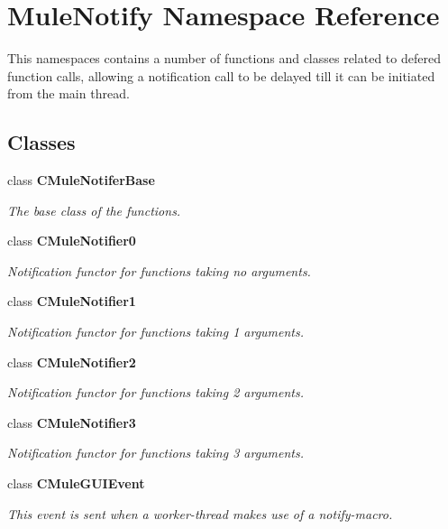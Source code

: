 \section{MuleNotify Namespace Reference}
\label{namespaceMuleNotify}


This namespaces contains a number of functions and classes related to defered function calls, allowing a notification call to be delayed till it can be initiated from the main thread.  
\subsection*{Classes}
\begin{DoxyCompactItemize}
\item 
class {\bf CMuleNotiferBase}
\begin{DoxyCompactList}\small\item\em The base class of the functions. \item\end{DoxyCompactList}\item 
class {\bf CMuleNotifier0}
\begin{DoxyCompactList}\small\item\em Notification functor for functions taking no arguments. \item\end{DoxyCompactList}\item 
class {\bf CMuleNotifier1}
\begin{DoxyCompactList}\small\item\em Notification functor for functions taking 1 arguments. \item\end{DoxyCompactList}\item 
class {\bf CMuleNotifier2}
\begin{DoxyCompactList}\small\item\em Notification functor for functions taking 2 arguments. \item\end{DoxyCompactList}\item 
class {\bf CMuleNotifier3}
\begin{DoxyCompactList}\small\item\em Notification functor for functions taking 3 arguments. \item\end{DoxyCompactList}\item 
class {\bf CMuleGUIEvent}
\begin{DoxyCompactList}\small\item\em This event is sent when a worker-\/thread makes use of a notify-\/macro. \item\end{DoxyCompactList}\end{DoxyCompactItemize}

